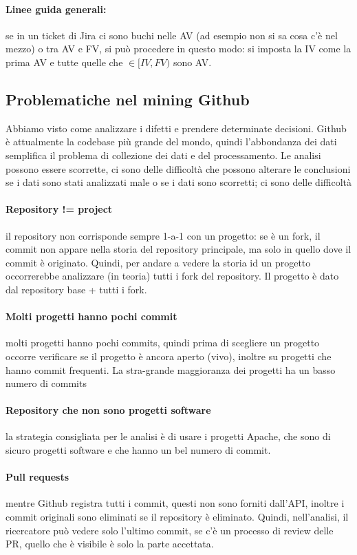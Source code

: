 \documentclass{article}
\begin{document}
\paragraph{Linee guida generali:}se in un ticket di Jira ci sono buchi nelle AV (ad esempio non si sa cosa c'è nel mezzo) o tra AV e FV, si può procedere in questo modo: si imposta la IV come la prima AV e tutte quelle che $\in [IV, FV)$ sono AV.
\subsection{Problematiche nel mining Github}
Abbiamo visto come analizzare i difetti e prendere determinate decisioni. Github è attualmente la codebase più grande del mondo, quindi l'abbondanza dei dati semplifica il problema di collezione dei dati e del processamento. Le analisi possono essere scorrette, ci sono delle difficoltà che possono alterare le conclusioni se i dati sono stati analizzati male o se i dati sono scorretti; ci sono delle difficoltà
\paragraph{Repository != project}il repository non corrisponde sempre 1-a-1 con un progetto: se è un fork, il commit non appare nella storia del repository principale, ma solo in quello dove il commit è originato. Quindi, per andare a vedere la storia id un progetto occorrerebbe analizzare (in teoria) tutti i fork del repository. Il progetto è dato dal repository base + tutti i fork.
\paragraph{Molti progetti hanno pochi commit}molti progetti hanno pochi commits, quindi prima di scegliere un progetto occorre verificare se il progetto è ancora aperto (vivo), inoltre su progetti che hanno commit frequenti. La stra-grande maggioranza dei progetti ha un basso numero di commits
\paragraph{Repository che non sono progetti software}la strategia consigliata per le analisi è di usare i progetti Apache, che sono di sicuro progetti software e che hanno un bel numero di commit.
\paragraph{Pull requests}mentre Github registra tutti i commit, questi non sono forniti dall'API, inoltre i commit originali sono eliminati se il repository è eliminato. Quindi, nell'analisi, il ricercatore può vedere solo l'ultimo commit, se c'è un processo di review delle PR, quello che è visibile è solo la parte accettata.
\end{document}
